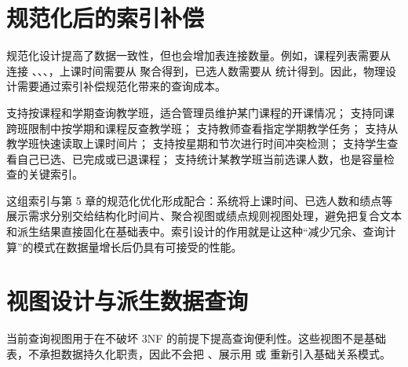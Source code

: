 \section{规范化后的索引补偿}

规范化设计提高了数据一致性，但也会增加表连接数量。例如，课程列表需要从  连接 、、、，上课时间需要从  聚合得到，已选人数需要从  统计得到。因此，物理设计需要通过索引补偿规范化带来的查询成本。

 支持按课程和学期查询教学班，适合管理员维护某门课程的开课情况； 支持同课跨班限制中按学期和课程反查教学班； 支持教师查看指定学期教学任务； 支持从教学班快速读取上课时间片； 支持按星期和节次进行时间冲突检测； 支持学生查看自己已选、已完成或已退课程； 支持统计某教学班当前选课人数，也是容量检查的关键索引。

这组索引与第 5 章的规范化优化形成配合：系统将上课时间、已选人数和绩点等展示需求分别交给结构化时间片、聚合视图或绩点规则视图处理，避免把复合文本和派生结果直接固化在基础表中。索引设计的作用就是让这种“减少冗余、查询计算”的模式在数据量增长后仍具有可接受的性能。

\section{视图设计与派生数据查询}

当前查询视图用于在不破坏 3NF 的前提下提高查询便利性。这些视图不是基础表，不承担数据持久化职责，因此不会把 、展示用  或  重新引入基础关系模式。

